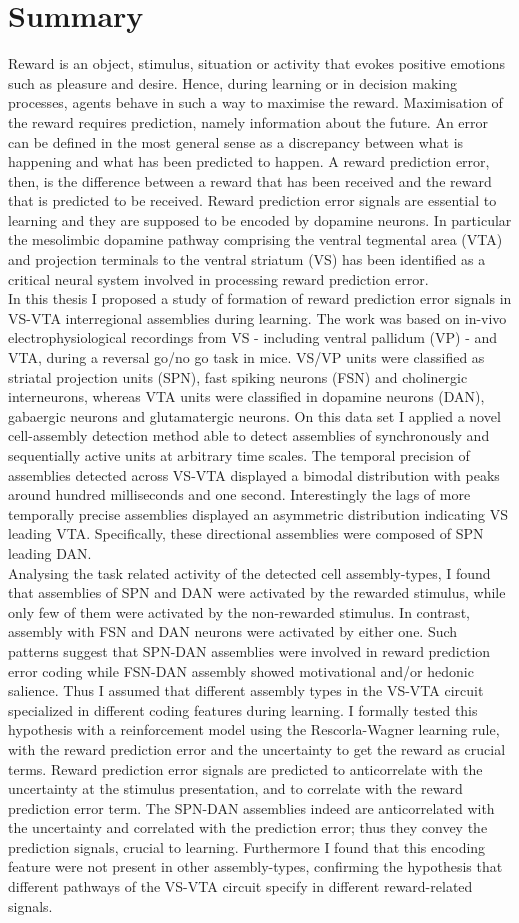\section*{Summary}
Reward is an object, stimulus, situation or activity that evokes positive emotions such as pleasure and desire. Hence, during learning or in decision making processes, agents behave in such a way to maximise the reward. Maximisation of the reward requires prediction, namely information about the future. An error can be defined in the most general sense as a discrepancy between what is happening and what has been predicted to happen. A reward prediction error, then, is the difference between a reward that has been received and the reward that is predicted to be received. Reward prediction error signals are essential to learning and they are supposed to be encoded by dopamine neurons. In particular the mesolimbic dopamine pathway comprising the ventral tegmental area (VTA) and projection terminals to the ventral striatum (VS) has been identified as a critical neural system involved in processing reward prediction error.\\In this thesis I proposed a study of formation of reward prediction error signals in VS-VTA interregional assemblies during learning. The work was based on in-vivo electrophysiological recordings from VS - including ventral pallidum (VP) - and VTA, during a reversal go/no go task in mice. VS/VP units were classified as striatal projection units (SPN), fast spiking neurons (FSN) and cholinergic interneurons, whereas VTA units were classified in dopamine neurons (DAN), gabaergic neurons and glutamatergic neurons. On this data set I applied a novel cell-assembly detection method able to detect assemblies of synchronously and sequentially active units at arbitrary time scales. The temporal precision of assemblies detected across VS-VTA displayed a bimodal distribution with peaks around hundred milliseconds and one second. Interestingly the lags of more temporally precise assemblies displayed an asymmetric distribution indicating VS leading VTA. Specifically, these directional assemblies were composed of SPN leading DAN.\\Analysing the task related activity of the detected cell assembly-types, I found that assemblies of SPN and DAN were activated by the rewarded stimulus, while only few of them were activated by the non-rewarded stimulus. In contrast, assembly with FSN and DAN neurons were activated by either one. Such patterns suggest that SPN-DAN assemblies were involved in reward prediction error coding while FSN-DAN assembly showed motivational and/or hedonic salience. Thus I assumed that different assembly types in the VS-VTA circuit specialized in different coding features during learning. I formally tested this hypothesis with a reinforcement model using the Rescorla-Wagner learning rule, with the reward prediction error and the uncertainty to get the reward as crucial terms. Reward prediction error signals are predicted to anticorrelate with the uncertainty at the stimulus presentation, and to correlate with the reward prediction error term. The SPN-DAN assemblies indeed are anticorrelated with the uncertainty and correlated with the prediction error; thus they convey the prediction signals, crucial to learning. Furthermore I found that this encoding feature were not present in other assembly-types, confirming the hypothesis that different pathways of the VS-VTA circuit specify in different reward-related signals.